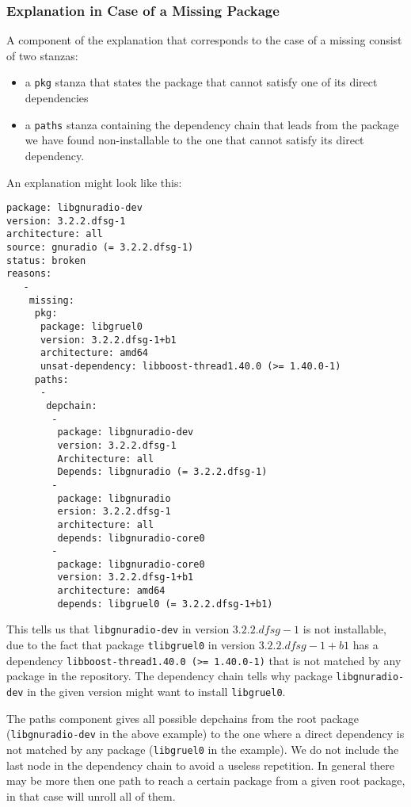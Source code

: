 \subsubsection{Explanation in Case of a Missing Package}
A component of the explanation that corresponds to the case of a
missing consist of two stanzas:
\begin{itemize}
\item a \texttt{pkg} stanza that states the package that cannot satisfy
  one of its direct dependencies
\item a \texttt{paths} stanza containing the dependency chain that
  leads from the package we have found non-installable to the one that
  cannot satisfy its direct dependency.
\end{itemize}
\begin{example}
An explanation might look like this:
\begin{verbatim}
package: libgnuradio-dev
version: 3.2.2.dfsg-1
architecture: all
source: gnuradio (= 3.2.2.dfsg-1)
status: broken
reasons:
   -
    missing:
     pkg:
      package: libgruel0
      version: 3.2.2.dfsg-1+b1
      architecture: amd64
      unsat-dependency: libboost-thread1.40.0 (>= 1.40.0-1)
     paths:
      -
       depchain:
        -
         package: libgnuradio-dev
         version: 3.2.2.dfsg-1
         Architecture: all
         Depends: libgnuradio (= 3.2.2.dfsg-1)
        -
         package: libgnuradio
         ersion: 3.2.2.dfsg-1
         architecture: all
         depends: libgnuradio-core0
        -
         package: libgnuradio-core0
         version: 3.2.2.dfsg-1+b1
         architecture: amd64
         depends: libgruel0 (= 3.2.2.dfsg-1+b1)
\end{verbatim}
This tells us that \texttt{libgnuradio-dev} in version $3.2.2.dfsg-1$
is not installable, due to the fact that package \texttt{tlibgruel0}
in version $3.2.2.dfsg-1+b1$ has a dependency
\texttt{libboost-thread1.40.0 (>= 1.40.0-1)} that is not matched by
any package in the repository. The dependency chain tells why package
\texttt{libgnuradio-dev} in the given version might want to install
\texttt{libgruel0}.
\end{example}

The paths component gives all possible depchains from the root package
(\texttt{libgnuradio-dev} in the above example) to the one where a
direct dependency is not matched by any package (\texttt{libgruel0} in
the example). We do not include the last node in the dependency chain
to avoid a useless repetition. In general there may be more then one
path to reach a certain package from a given root package, in that
case \debcheck{} will unroll all of them.

